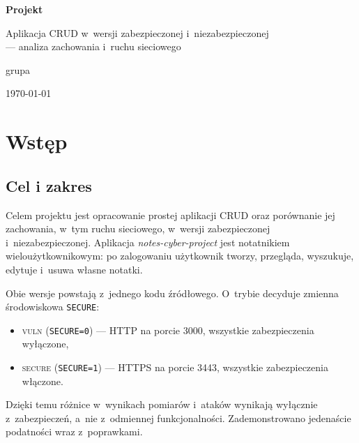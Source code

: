 \documentclass[12pt,a4paper]{article}
\newcommand{\kod}[1]{\texttt{#1}}
\newcommand{\vuln}{\textsc{vuln}}
\newcommand{\secure}{\textsc{secure}}
\begin{document}
\begin{titlepage}
\centering
\vspace*{\fill}
{\large \uczelnia\par}
{\large \wydzial\par}
{\large \katedra\par}
\vfill
{\large \przedmiot\par}
\vspace{0.6cm}
{\LARGE\bfseries Projekt\par}
\vspace{0.35cm}
{\large Aplikacja CRUD w~wersji zabezpieczonej i~niezabezpieczonej \\ --- analiza zachowania i~ruchu sieciowego\par}
\vfill
{\large \autorzy\par}
{\large grupa \grupa\par}
\vspace{0.3cm}
{\large \today\par}
\vspace*{\fill}
\end{titlepage}

\tableofcontents
\newpage
{}

\section{Wstęp}

\subsection{Cel i zakres}
Celem projektu jest opracowanie prostej aplikacji CRUD oraz porównanie jej zachowania, w~tym ruchu sieciowego, w~wersji zabezpieczonej i~niezabezpieczonej. Aplikacja \emph{notes-cyber-project} jest notatnikiem wieloużytkownikowym: po zalogowaniu użytkownik tworzy, przegląda, wyszukuje, edytuje i~usuwa własne notatki.

Obie wersje powstają z~jednego kodu źródłowego. O~trybie decyduje zmienna środowiskowa \kod{SECURE}:
\begin{itemize}
\item \vuln{} (\kod{SECURE=0}) --- HTTP na porcie 3000, wszystkie zabezpieczenia wyłączone,
\item \secure{} (\kod{SECURE=1}) --- HTTPS na porcie 3443, wszystkie zabezpieczenia włączone.
\end{itemize}
Dzięki temu różnice w~wynikach pomiarów i~ataków wynikają wyłącznie z~zabezpieczeń, a~nie z~odmiennej funkcjonalności. Zademonstrowano jedenaście podatności wraz z~poprawkami.
\end{document}
